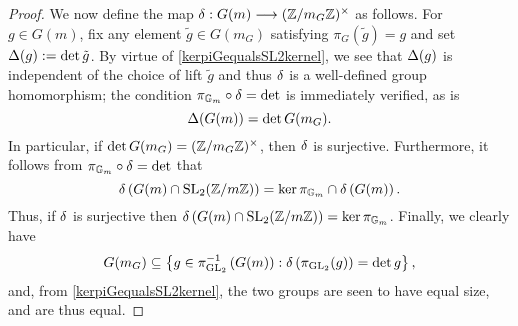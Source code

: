 \begin{proof}
We now define the map $\delta : G(m) \longrightarrow (\mathbb{Z}/m_G\mathbb{Z})^\times$ as follows.  For $g \in G(m)$, fix any element $\tilde{g} \in G(m_G)$ satisfying $\pi_G(\tilde{g}) = g$ and set $\Delta(g) := \det \tilde{g}$.  By virtue of \eqref{kerpiGequalsSL2kernel}, we see that $\Delta(g)$ is independent of the choice of lift $\tilde{g}$ and thus $\delta$ is a well-defined group homomorphism; the condition $\pi_{\mathbb{G}_m} \circ \delta = \det$ is immediately verified, as is
\begin{equation} \label{imageofdelta}
\Delta(G(m)) = \det G(m_G).
\end{equation}
In particular, if $\det G(m_G) = (\mathbb{Z}/m_G\mathbb{Z})^\times$, then $\delta$ is surjective.  Furthermore, it follows from $\pi_{\mathbb{G}_m} \circ \delta = \det$ that
\[
\delta\left( G(m) \cap \operatorname{SL}_2(\mathbb{Z}/m\mathbb{Z}) \right) = \ker \pi_{\mathbb{G}_m} \cap \delta \left( G(m) \right) .
\]
Thus, if $\delta$ is surjective then $\delta\left( G(m) \cap \operatorname{SL}_2(\mathbb{Z}/m\mathbb{Z}) \right) = \ker \pi_{\mathbb{G}_m}$.  Finally, 
we clearly have
\[
G(m_G) \subseteq \left\{ g \in \pi_{\operatorname{GL}_2}^{-1}\left( G(m) \right) : \delta\left( \pi_{\operatorname{GL}_2}(g) \right) = \det g \right\},
\]
and, from \eqref{kerpiGequalsSL2kernel}, the two groups are seen to have equal size, and are thus equal.
\end{proof}
